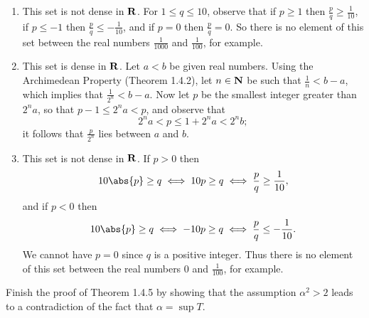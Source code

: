 \documentclass{lew98_solutions}
\begin{document}
\begin{solution}
    \begin{enumerate}
        \item This set is not dense in \( \mathbf{R} \). For \( 1 \leq q \leq 10 \), observe that if \( p \geq 1 \) then \( \tfrac{p}{q} \geq \tfrac{1}{10} \), if \( p \leq -1 \) then \( \tfrac{p}{q} \leq -\tfrac{1}{10} \), and if \( p = 0 \) then \( \tfrac{p}{q} = 0 \). So there is no element of this set between the real numbers \( \tfrac{1}{1000} \) and \( \tfrac{1}{100} \), for example.

        \item This set is dense in \( \mathbf{R} \). Let \( a < b \) be given real numbers. Using the Archimedean Property (Theorem 1.4.2), let \( n \in \mathbf{N} \) be such that \( \tfrac{1}{n} < b - a \), which implies that \( \tfrac{1}{2^n} < b - a \). Now let \( p \) be the smallest integer greater than \( 2^n a \), so that \( p - 1 \leq 2^n a < p \), and observe that
        \[
            2^n a < p \leq 1 + 2^n a < 2^n b;
        \]
        it follows that \( \tfrac{p}{2^n} \) lies between \( a \) and \( b \).

        \item This set is not dense in \( \mathbf{R} \). If \( p > 0 \) then
        \[
            10 \abs{p} \geq q \iff 10p \geq q \iff \frac{p}{q} \geq \frac{1}{10},
        \]
        and if \( p < 0 \) then
        \[
            10 \abs{p} \geq q \iff -10p \geq q \iff \frac{p}{q} \leq -\frac{1}{10}.
        \]
        We cannot have \( p = 0 \) since \( q \) is a positive integer. Thus there is no element of this set between the real numbers \( 0 \) and \( \tfrac{1}{100} \), for example.
    \end{enumerate}
\end{solution}

\begin{exercise}
\label{ex:1.4.7}
    Finish the proof of Theorem 1.4.5 by showing that the assumption \( \alpha^2 > 2 \) leads to a contradiction of the fact that \( \alpha = \sup T \).
\end{exercise}
\end{document}
